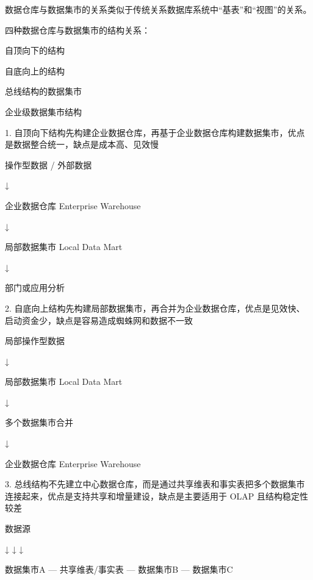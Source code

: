 \documentclass[UTF8,zihao=-4]{ctexart}
\begin{document}
数据仓库与数据集市的关系类似于传统关系数据库系统中“基表”和“视图”的关系。\par

四种数据仓库与数据集市的结构关系：\par

自顶向下的结构\par
自底向上的结构\par
总线结构的数据集市\par
企业级数据集市结构\par

1. 自顶向下结构先构建企业数据仓库，再基于企业数据仓库构建数据集市，优点是数据整合统一，缺点是成本高、见效慢\par

操作型数据 / 外部数据\par
\hspace*{1em}↓\par
企业数据仓库 Enterprise Warehouse\par
\hspace*{1em}↓\par
局部数据集市 Local Data Mart\par
\hspace*{1em}↓\par
部门或应用分析\par

2. 自底向上结构先构建局部数据集市，再合并为企业数据仓库，优点是见效快、启动资金少，缺点是容易造成蜘蛛网和数据不一致\par

局部操作型数据\par
\hspace*{1em}↓\par
局部数据集市 Local Data Mart\par
\hspace*{1em}↓\par
多个数据集市合并\par
\hspace*{1em}↓\par
企业数据仓库 Enterprise Warehouse\par

3. 总线结构不先建立中心数据仓库，而是通过共享维表和事实表把多个数据集市连接起来，优点是支持共享和增量建设，缺点是主要适用于 OLAP 且结构稳定性较差\par

数据源\par
\hspace*{1em}↓        ↓        ↓\par
数据集市A — 共享维表/事实表 — 数据集市B — 数据集市C\par
\end{document}
